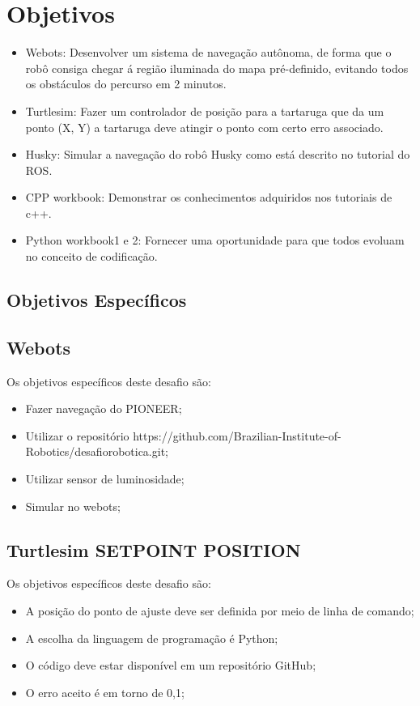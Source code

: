 \section{Objetivos}
\label{sec:obj}
\begin{itemize}
      \item Webots:
Desenvolver um sistema de navegação autônoma, de forma que o robô consiga chegar 
á região iluminada do mapa pré-definido, evitando todos os obstáculos do percurso em 2 minutos.
      \item Turtlesim:
Fazer um controlador de posição para a tartaruga que da um ponto (X, Y) a tartaruga 
deve atingir o ponto com certo erro associado.
      \item Husky:
Simular a navegação do robô Husky como está descrito no tutorial do ROS.
      \item CPP workbook:
Demonstrar os conhecimentos adquiridos nos tutoriais de c++.
      \item Python workbook1 e 2:
Fornecer uma oportunidade para que todos evoluam no conceito de codificação.
  \end{itemize}
\subsection{Objetivos Específicos}
\label{ssec:objesp}
\subsection{Webots}
Os objetivos específicos deste desafio são:
\begin{itemize}
      \item Fazer navegação do PIONEER;
      \item Utilizar o repositório https://github.com/Brazilian-Institute-of-Robotics/desafiorobotica.git;
      \item Utilizar sensor de luminosidade;
      \item Simular no webots;
  \end{itemize}
\subsection{Turtlesim SETPOINT POSITION}
Os objetivos específicos deste desafio são:
\begin{itemize}
      \item A posição do ponto de ajuste deve ser definida por meio de linha de comando;
      \item A escolha da linguagem de programação é Python;
      \item O código deve estar disponível em um repositório GitHub;
      \item O erro aceito é em torno de 0,1;
  \end{itemize}
